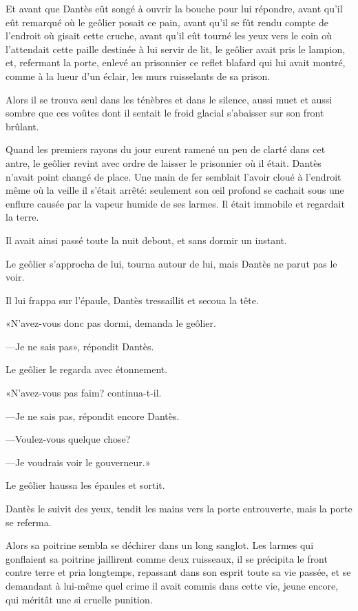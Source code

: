 Et avant que Dantès eût songé à ouvrir la bouche pour lui répondre, avant qu'il eût remarqué où le geôlier posait ce pain, avant qu'il se fût rendu compte de l'endroit où gisait cette cruche, avant qu'il eût tourné les yeux vers le coin où l'attendait cette paille destinée à lui servir de lit, le geôlier avait pris le lampion, et, refermant la porte, enlevé au prisonnier ce reflet blafard qui lui avait montré, comme à la lueur d'un éclair, les murs ruisselants de sa prison.

Alors il se trouva seul dans les ténèbres et dans le silence, aussi muet et aussi sombre que ces voûtes dont il sentait le froid glacial s'abaisser sur son front brûlant.

Quand les premiers rayons du jour eurent ramené un peu de clarté dans cet antre, le geôlier revint avec ordre de laisser le prisonnier où il était. Dantès n'avait point changé de place. Une main de fer semblait l'avoir cloué à l'endroit même où la veille il s'était arrêté: seulement son œil profond se cachait sous une enflure causée par la vapeur humide de ses larmes. Il était immobile et regardait la terre.

Il avait ainsi passé toute la nuit debout, et sans dormir un instant.

Le geôlier s'approcha de lui, tourna autour de lui, mais Dantès ne parut pas le voir.

Il lui frappa sur l'épaule, Dantès tressaillit et secoua la tête.

«N'avez-vous donc pas dormi, demanda le geôlier.

—Je ne sais pas», répondit Dantès.

Le geôlier le regarda avec étonnement.

«N'avez-vous pas faim? continua-t-il.

—Je ne sais pas, répondit encore Dantès.

—Voulez-vous quelque chose?

—Je voudrais voir le gouverneur.»

Le geôlier haussa les épaules et sortit.

Dantès le suivit des yeux, tendit les mains vers la porte entrouverte, mais la porte se referma.

Alors sa poitrine sembla se déchirer dans un long sanglot. Les larmes qui gonflaient sa poitrine jaillirent comme deux ruisseaux, il se précipita le front contre terre et pria longtemps, repassant dans son esprit toute sa vie passée, et se demandant à lui-même quel crime il avait commis dans cette vie, jeune encore, qui méritât une si cruelle punition.

